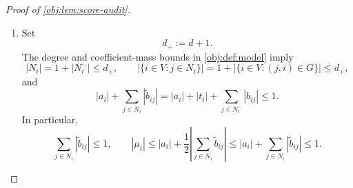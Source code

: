 \begin{proof}[Proof of \cref{obj:lem:score-audit}]
\begin{enumerate}
For any subsets \(E_1,E_2\subseteq V\), independence and centering imply
\[
\mathbb E_Z\!\left[
\left(\prod_{j\in E_1}(Z_j-\tfrac12)\right)
\left(\prod_{k\in E_2}(Z_k-\tfrac12)\right)
\right]
=
\begin{cases}
4^{-|E_1|},&E_1=E_2,\\
0,&E_1\ne E_2.
\end{cases}
\]
Indeed, when the sets agree, every factor is a square equal to \(1/4\). When they differ, a coordinate in their symmetric difference contributes an independent factor with mean zero. Using
\[
\prod_{j\in E_1}X_j
=2^{|E_1|}\prod_{j\in E_1}(Z_j-\tfrac12)
\]
and the corresponding identity for \(E_2\), we obtain
\[
\mathbb E_Z\!\left[
\left(\prod_{j\in E_1}X_j\right)
\left(\prod_{k\in E_2}X_k\right)
\right]
=\mathbf1_{\{E_1=E_2\}}.
\]
The empty product equals one, so these formulas include empty sets.

In particular,
\[
\mathbb E_Z[X_\ell X_jX_k]=0
\qquad(\ell,j,k\in V,\ j\ne k),
\]
because the singleton \(\{\ell\}\) differs from the two-element set \(\{j,k\}\). Expanding the collected linear term against the quadratic term expresses every summand of their cross moment as a constant times such a triple moment. Hence
\[
\mathbb E_Z[2T_{G,\mathrm{lin}}T_{G,\mathrm{quad}}]=0,
\qquad
\operatorname{Var}_Z(T_G)
=\mathbb E_Z[T_{G,\mathrm{lin}}^2]
+\mathbb E_Z[T_{G,\mathrm{quad}}^2].
\]

\item Set
\[
d_+:=d+1.
\]
The degree and coefficient-mass bounds in \cref{obj:def:model} imply
\[
|N_i|=1+|N_i^-|\le d_+,
\qquad
\left|\{i\in V:j\in N_i\}\right|
=1+\left|\{i\in V:(j,i)\in G\}\right|
\le d_+,
\]
and
\[
|a_i|+\sum_{j\in N_i}|\widetilde b_{ij}|
=
|a_i|+|t_i|+\sum_{j\in N_i^-}|b_{ij}|
\le1.
\]
In particular,
\[
\sum_{j\in N_i}|\widetilde b_{ij}|\le1,
\qquad
|\mu_i|
\le |a_i|+\frac12\left|\sum_{j\in N_i}\widetilde b_{ij}\right|
\le |a_i|+\sum_{j\in N_i}|\widetilde b_{ij}|
\le1.
\]


\end{enumerate}
\end{proof}

